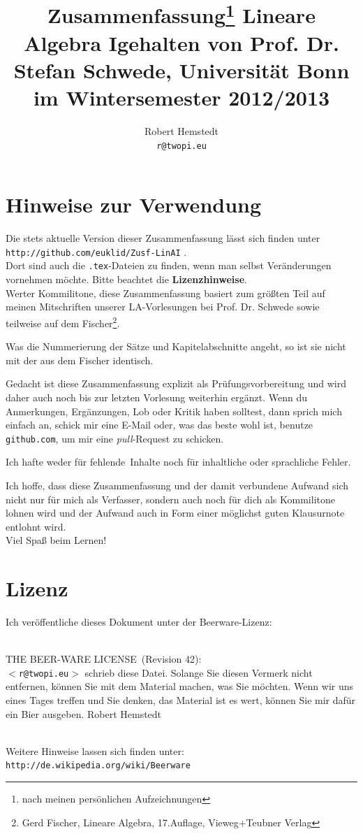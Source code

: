 \documentclass[12pt,a4paper]{article}
\author{Robert Hemstedt \\ \texttt{r@twopi.eu}}
\title{Zusammenfassung\footnote{nach meinen pers\"onlichen Aufzeichnungen} Lineare Algebra I\newline \newline \large{gehalten von Prof. Dr. Stefan Schwede, Universität Bonn} \\im Wintersemester 2012/2013}
\theoremstyle{plain}
\numberwithin{equation}{section}
\newenvironment{fmpage}[1]
{\begin{lrbox}{\fmbox}\begin{minipage}{#1}}
{\end{minipage}\end{lrbox}\fbox{\usebox{\fmbox}}}
\begin{document}
\maketitle
\section*{Hinweise zur Verwendung}
Die stets aktuelle Version dieser Zusammenfassung lässt sich finden unter\\
\texttt{http://github.com/euklid/Zusf-LinAI} .\\
Dort sind auch die \texttt{.tex}-Dateien zu finden, wenn man selbst Veränderungen vornehmen möchte. Bitte beachtet die \textbf{Lizenzhinweise}.\\

Werter Kommilitone, diese Zusammenfassung basiert zum größten Teil auf meinen Mitschriften unserer LA-Vorlesungen bei Prof. Dr. Schwede sowie teilweise auf dem Fischer\footnote{Gerd Fischer, Lineare Algebra, 17.Auflage, Vieweg+Teubner Verlag}. 

Was die Nummerierung der Sätze und Kapitelabschnitte angeht, so ist sie nicht mit der aus dem Fischer identisch.

Gedacht ist diese Zusammenfassung explizit als Prüfungsvorbereitung und wird daher auch noch bis zur letzten Vorlesung weiterhin ergänzt. Wenn du Anmerkungen, Ergänzungen, Lob oder Kritik haben solltest, dann sprich mich einfach an, schick mir eine E-Mail oder, was das beste wohl ist, benutze \texttt{github.com}, um mir eine \textit{pull}-Request zu schicken.

Ich hafte weder für \glqq fehlende\grqq\ Inhalte noch für inhaltliche oder sprachliche Fehler.

Ich hoffe, dass diese Zusammenfassung und der damit verbundene Aufwand sich nicht nur für mich als Verfasser, sondern auch noch für dich als Kommilitone lohnen wird und der Aufwand auch in Form einer möglichst guten Klausurnote entlohnt wird. \\
Viel Spaß beim Lernen!
\section*{Lizenz}
Ich veröffentliche dieses Dokument unter der Beerware-Lizenz:\\ \\
\hspace{-3.5cm}
\begin{fmpage}{\textwidth}
\glqq THE BEER-WARE LICENSE\grqq\ (Revision 42):\\
\texttt{$<$r@twopi.eu$>$} schrieb diese Datei. Solange Sie diesen Vermerk nicht entfernen, können Sie mit dem Material machen, was Sie möchten. Wenn wir uns eines Tages treffen und Sie denken, das Material ist es wert, können Sie mir dafür ein Bier ausgeben. Robert Hemstedt
\end{fmpage}
\hspace{3.5cm} \\
Weitere Hinweise lassen sich finden unter: \texttt{http://de.wikipedia.org/wiki/Beerware}
\end{document}
